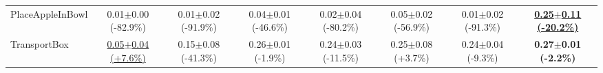 \begin{table}[htbp]
\begin{adjustbox}{max width=\textwidth}
\begin{tabular}{l*{7}{c}}
PlaceAppleInBowl & 0.01$\pm$0.00 \scriptsize{(-82.9\%)} & 0.01$\pm$0.02 \scriptsize{(-91.9\%)} & 0.04$\pm$0.01 \scriptsize{(-46.6\%)} & 0.02$\pm$0.04 \scriptsize{(-80.2\%)} & 0.05$\pm$0.02 \scriptsize{(-56.9\%)} & 0.01$\pm$0.02 \scriptsize{(-91.3\%)} & \textbf{\underline{0.25$\pm$0.11 \scriptsize{(-20.2\%)}}} \\
TransportBox & \underline{0.05$\pm$0.04 \scriptsize{(+7.6\%)}} & 0.15$\pm$0.08 \scriptsize{(-41.3\%)} & 0.26$\pm$0.01 \scriptsize{(-1.9\%)} & 0.24$\pm$0.03 \scriptsize{(-11.5\%)} & 0.25$\pm$0.08 \scriptsize{(+3.7\%)} & 0.24$\pm$0.04 \scriptsize{(-9.3\%)} & \textbf{0.27$\pm$0.01 \scriptsize{(-2.2\%)}} \\
\bottomrule
\end{tabular}
\end{adjustbox}
\end{table}

